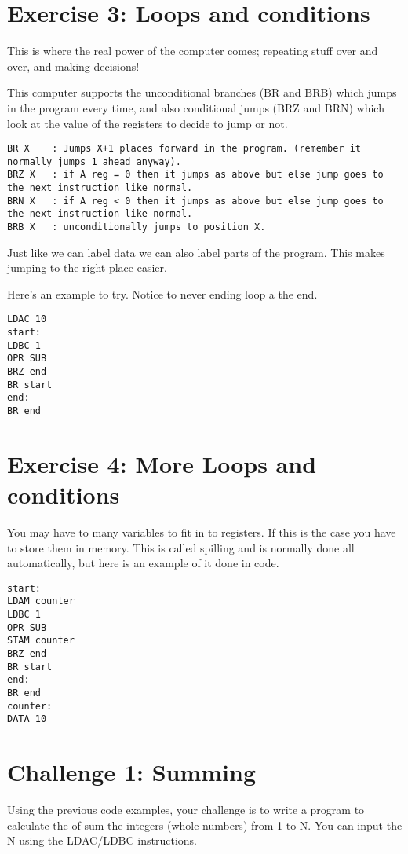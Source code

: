 \documentclass[10pt,a4paper]{article}
\begin{document}
\section{Exercise 3: Loops and conditions}

This is where the real power of the computer comes; repeating stuff over and over, and making decisions!

This computer supports the unconditional branches (BR and BRB) which jumps in the program every time, and also conditional jumps (BRZ and BRN) which look at the value of the registers to decide to jump or not.
\begin{verbatim}
BR X	: Jumps X+1 places forward in the program. (remember it normally jumps 1 ahead anyway).
BRZ X 	: if A reg = 0 then it jumps as above but else jump goes to the next instruction like normal.
BRN X	: if A reg < 0 then it jumps as above but else jump goes to the next instruction like normal.
BRB X	: unconditionally jumps to position X.
\end{verbatim}

Just like we can label data we can also label parts of the program. This makes jumping to the right place easier.

Here's an example to try. Notice to never ending loop a the end.
\begin{lstlisting}[frame=single]
LDAC 10
start:
LDBC 1
OPR SUB
BRZ end
BR start
end:
BR end
\end{lstlisting}

\section{Exercise 4: More Loops and conditions}
You may have to many variables to fit in to registers. If this is the case you have to store them in memory. This is called spilling and is normally done all automatically, but here is an example of it done in code.

\begin{lstlisting}[frame=single]
start:
LDAM counter
LDBC 1
OPR SUB
STAM counter
BRZ end
BR start
end:
BR end
counter:
DATA 10
\end{lstlisting}

\section{Challenge 1: Summing}
Using the previous code examples, your challenge is to write a program to calculate the of sum the integers (whole numbers) from 1 to N. You can input the N using the LDAC/LDBC instructions.
\end{document}
